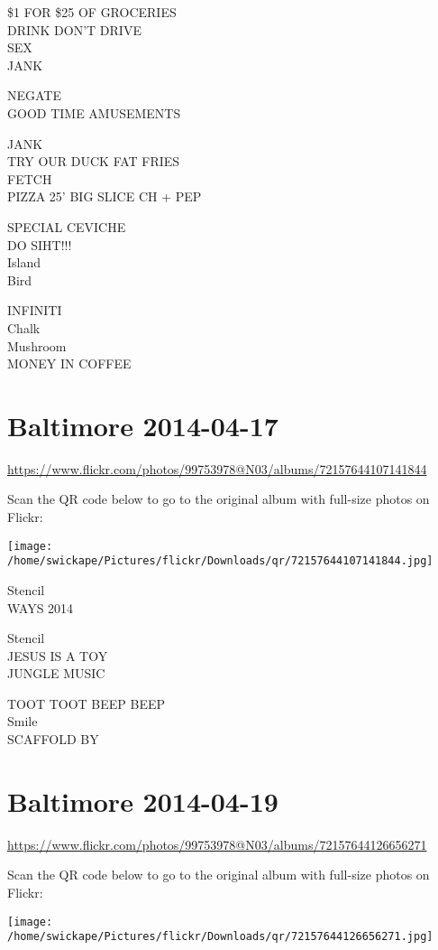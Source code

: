 \documentclass[10pt,letterpaper]{article}
\begin{document}
\$1 FOR \$25 OF GROCERIES\\
DRINK DON'T DRIVE\\
SEX\\
JANK

NEGATE\\
GOOD TIME AMUSEMENTS

JANK\\
TRY OUR DUCK FAT FRIES\\
FETCH\\
PIZZA 25' BIG SLICE CH + PEP

SPECIAL CEVICHE\\
DO SIHT!!!\\
Island\\
Bird

INFINITI\\
Chalk\\
Mushroom\\
MONEY IN COFFEE
\pagebreak

\section*{Baltimore 2014-04-17}

\url{https://www.flickr.com/photos/99753978@N03/albums/72157644107141844}

Scan the QR code below to go to the original album with full-size photos on Flickr:

\texttt{[image: /home/swickape/Pictures/flickr/Downloads/qr/72157644107141844.jpg]}
\pagebreak

Stencil\\
WAYS 2014

Stencil\\
JESUS IS A TOY\\
JUNGLE MUSIC

TOOT TOOT BEEP BEEP\\
Smile\\
SCAFFOLD BY
\pagebreak

\section*{Baltimore 2014-04-19}

\url{https://www.flickr.com/photos/99753978@N03/albums/72157644126656271}

Scan the QR code below to go to the original album with full-size photos on Flickr:

\texttt{[image: /home/swickape/Pictures/flickr/Downloads/qr/72157644126656271.jpg]}
\pagebreak
\end{document}
